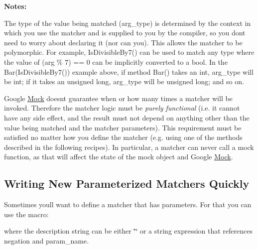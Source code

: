 {\bfseries{Notes\+:}}


\begin{DoxyEnumerate}
\item The type of the value being matched ({\ttfamily arg\+\_\+type}) is determined by the context in which you use the matcher and is supplied to you by the compiler, so you don\textquotesingle{}t need to worry about declaring it (nor can you). This allows the matcher to be polymorphic. For example, {\ttfamily Is\+Divisible\+By7()} can be used to match any type where the value of {\ttfamily (arg \% 7) == 0} can be implicitly converted to a {\ttfamily bool}. In the {\ttfamily Bar(\+Is\+Divisible\+By7())} example above, if method {\ttfamily Bar()} takes an {\ttfamily int}, {\ttfamily arg\+\_\+type} will be {\ttfamily int}; if it takes an {\ttfamily unsigned long}, {\ttfamily arg\+\_\+type} will be {\ttfamily unsigned long}; and so on.
\end{DoxyEnumerate}
\begin{DoxyEnumerate}
\item Google \mbox{\hyperlink{class_mock}{Mock}} doesn\textquotesingle{}t guarantee when or how many times a matcher will be invoked. Therefore the matcher logic must be {\itshape purely functional} (i.\+e. it cannot have any side effect, and the result must not depend on anything other than the value being matched and the matcher parameters). This requirement must be satisfied no matter how you define the matcher (e.\+g. using one of the methods described in the following recipes). In particular, a matcher can never call a mock function, as that will affect the state of the mock object and Google \mbox{\hyperlink{class_mock}{Mock}}.
\end{DoxyEnumerate}

\subsection*{Writing New Parameterized Matchers Quickly}

Sometimes you\textquotesingle{}ll want to define a matcher that has parameters. For that you can use the macro\+: 
\begin{DoxyCode}{0}
\end{DoxyCode}
 where the description string can be either {\ttfamily \char`\"{}\char`\"{}} or a string expression that references {\ttfamily negation} and {\ttfamily param\+\_\+name}.

